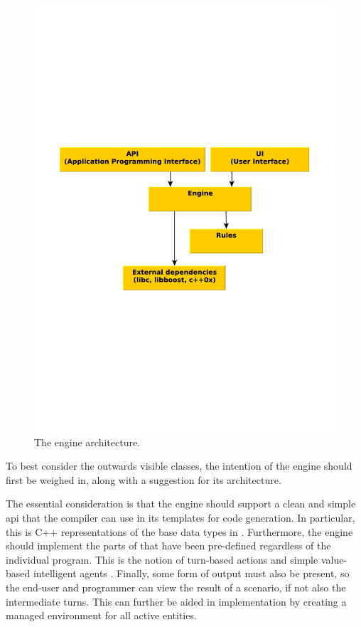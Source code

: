 \begin{figure}
\centering
	\includegraphics[scale=.4, clip=true, trim=2cm 10cm 2cm 10cm]{img/engine_architecture}
	\caption{\label{figure:design:engine:arch}The engine architecture.}
\end{figure}

To best consider the outwards visible classes, the intention of the engine should first be weighed in, along with a suggestion for its architecture.

The essential consideration is that the engine should support a clean and simple \ac{api} that the compiler can use in its templates for code generation. In particular, this is C++ representations of the base data types in \langname{}. Furthermore, the engine should implement the parts of \langname{} that have been pre-defined regardless of the individual program. This is the notion of turn-based actions and simple value-based intelligent agents . Finally, some form of output must also be present, so the end-user and programmer can view the result of a scenario, if not also the intermediate turns. This can further be aided in implementation by creating a managed environment for all active \langname{} entities.


